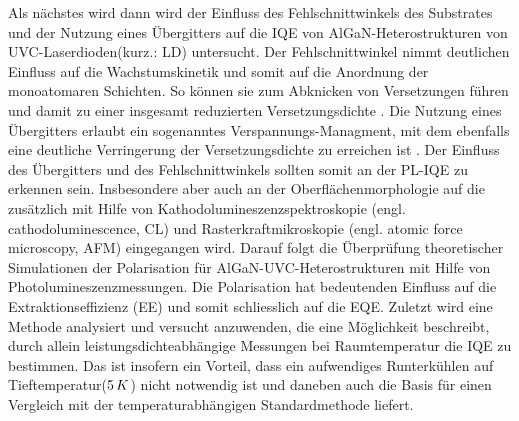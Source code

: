 Als nächstes wird dann wird der Einfluss des Fehlschnittwinkels des Substrates und der Nutzung eines Übergitters auf die IQE von AlGaN-Heterostrukturen von UVC-Laserdioden(kurz.: LD) untersucht. Der Fehlschnittwinkel nimmt deutlichen Einfluss auf die Wachstumskinetik und somit auf die Anordnung der monoatomaren Schichten. So können sie zum Abknicken von Versetzungen führen und damit zu einer insgesamt reduzierten Versetzungsdichte \cite{jeschke}. Die Nutzung eines Übergitters erlaubt ein sogenanntes Verspannungs-Managment, mit dem ebenfalls eine deutliche Verringerung der Versetzungsdichte zu erreichen ist \cite{doi:10.1063/1.2136424}. Der Einfluss des Übergitters und des Fehlschnittwinkels sollten somit an der PL-IQE zu erkennen sein. Insbesondere aber auch an der Oberflächenmorphologie auf die zusätzlich mit Hilfe von Kathodolumineszenzspektroskopie (engl. cathodoluminescence, CL) und Rasterkraftmikroskopie (engl. atomic force microscopy, AFM) eingegangen wird.
\newline
Darauf folgt die Überprüfung theoretischer Simulationen der Polarisation für AlGaN-UVC-Heterostrukturen mit Hilfe von Photolumineszenzmessungen. Die Polarisation hat bedeutenden Einfluss auf die Extraktionseffizienz (EE) und somit schliesslich auf die EQE.
\newline
Zuletzt wird eine Methode analysiert und versucht anzuwenden, die eine Möglichkeit beschreibt, durch allein leistungsdichteabhängige Messungen bei Raumtemperatur die IQE zu bestimmen. Das ist insofern ein Vorteil, dass ein aufwendiges Runterkühlen auf Tieftemperatur($5 \thinspace K$) nicht notwendig ist und daneben auch die Basis für einen Vergleich mit der temperaturabhängigen Standardmethode liefert.













